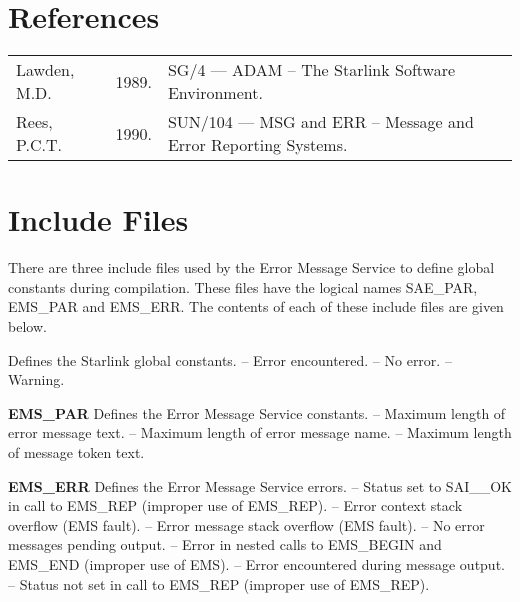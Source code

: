 \section {References}

\begin {trivlist} \item[]
\begin {tabular}{lll}
Lawden, M.D. & 1989. & SG/4 --- ADAM -- The Starlink Software Environment.\\
Rees, P.C.T. & 1990. & SUN/104 --- MSG and ERR -- Message and Error Reporting
Systems.\\
\end {tabular}
\end {trivlist}

\newpage
\appendix
\section {Include Files} \label{incl_sect}

There are three include files used by the Error Message Service to define
global constants during compilation. 
These files have the logical names SAE\_PAR, EMS\_PAR and EMS\_ERR.
The contents of each of these include files are given below.

\begin {description}
\item [SAE\_PAR] Defines the Starlink global constants.
 -- Error encountered.
 -- No error.
 -- Warning.
\indexspace
\item {\bf EMS\_PAR} Defines the Error Message Service constants.
 -- Maximum length of error message text.
 -- Maximum length of error message name.
 -- Maximum length of message token text.
\indexspace
\item {\bf EMS\_ERR} Defines the Error Message Service errors.
 -- Status set to SAI\_\_OK in call to EMS\_REP
(improper use of EMS\_REP).
 -- Error context stack overflow (EMS fault).
 -- Error message stack overflow (EMS fault).
 -- No error messages pending output.
 -- Error in nested calls to EMS\_BEGIN and EMS\_END
(improper use of EMS).
 -- Error encountered during message output.
 -- Status not set in call to EMS\_REP (improper
use of EMS\_REP). 
\end {description}

